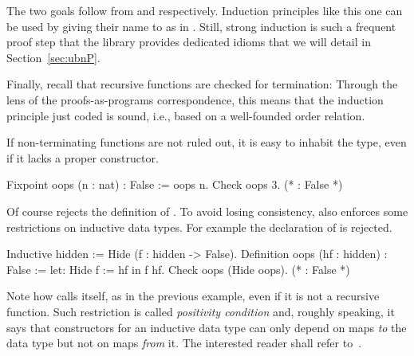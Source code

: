 The two goals follow from  and  respectively.
Induction principles like this one can be used by giving their name to  as in
. Still, strong induction is such a frequent
proof step that the \mcbMC{} library provides dedicated idioms
that we will detail in Section~\ref{sec:ubnP}.

Finally, recall that recursive functions are checked for termination:
Through the lens of the proofs-as-programs correspondence, this means
that the induction principle just coded is sound, i.e., based on a
well-founded order relation.

If non-terminating functions are not ruled out, it is easy to inhabit
the  type, even if it lacks a proper constructor.

\begin{coq}{}{}
Fixpoint oops (n : nat) : False := oops n.
Check oops 3.  (* : False *)
\end{coq}
Of course \Coq{} rejects the definition of .  To avoid
losing consistency, \Coq{} also enforces some restrictions on
inductive data types.  For example the declaration of 
is rejected.

\begin{coq}{}{}
Inductive hidden := Hide (f : hidden -> False).
Definition oops (hf : hidden) : False := let: Hide f := hf in f hf.
Check oops (Hide oops).  (* : False *)
\end{coq}
Note how  calls itself, as in the previous example,
even if it is not a recursive function.
Such restriction is called
\emph{positivity condition} and,
roughly speaking, it says that constructors for an inductive data
type can only depend on maps \emph{to} the data type but not on maps
\emph{from} it.
The interested reader shall refer to~\cite{Coq:manual}.



